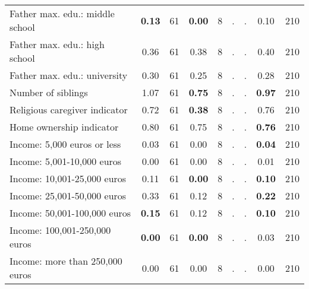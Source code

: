 \begin{tabular}{l c c c c c c c c}
Father max. edu.: middle school & \textbf{     0.13} &        61 & \textbf{     0.00} &         8 &         . & . &      0.10 &       210 \\
Father max. edu.: high school &      0.36 &        61 &      0.38 &         8 &         . & . &      0.40 &       210 \\
Father max. edu.: university &      0.30 &        61 &      0.25 &         8 &         . & . &      0.28 &       210 \\
Number of siblings &      1.07 &        61 & \textbf{     0.75} &         8 &         . & . & \textbf{     0.97} &       210 \\
Religious caregiver indicator &      0.72 &        61 & \textbf{     0.38} &         8 &         . & . &      0.76 &       210 \\
Home ownership indicator &      0.80 &        61 &      0.75 &         8 &         . & . & \textbf{     0.76} &       210 \\
Income: 5,000 euros or less &      0.03 &        61 &      0.00 &         8 &         . & . & \textbf{     0.04} &       210 \\
Income: 5,001-10,000 euros &      0.00 &        61 &      0.00 &         8 &         . & . &      0.01 &       210 \\
Income: 10,001-25,000 euros &      0.11 &        61 & \textbf{     0.00} &         8 &         . & . & \textbf{     0.10} &       210 \\
Income: 25,001-50,000 euros &      0.33 &        61 &      0.12 &         8 &         . & . & \textbf{     0.22} &       210 \\
Income: 50,001-100,000 euros & \textbf{     0.15} &        61 &      0.12 &         8 &         . & . & \textbf{     0.10} &       210 \\
Income: 100,001-250,000 euros & \textbf{     0.00} &        61 & \textbf{     0.00} &         8 &         . & . &      0.03 &       210 \\
Income: more than 250,000 euros &      0.00 &        61 &      0.00 &         8 &         . & . &      0.00 &       210 \\
\bottomrule
\end{tabular}
